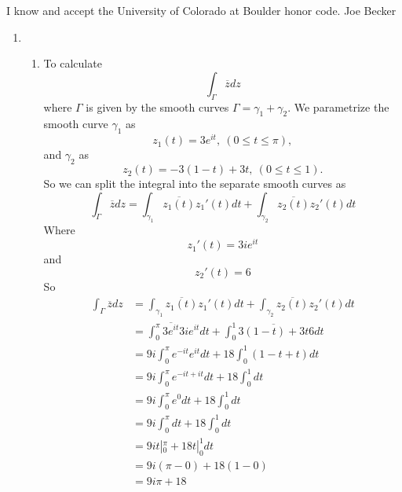 \documentclass[11pt]{article}
\newcommand{\zbar}{\overline{z}}
\begin{document}

I know and accept the University of Colorado at Boulder honor code.
\linebreak
\linebreak
\linebreak
Joe Becker

\begin{enumerate}
\item  
\begin{enumerate}
\item  
To calculate 
$$\int_{\Gamma}\zbar dz$$
where $\Gamma$ is given by the smooth curves $\Gamma = \gamma_1+\gamma_2$. We parametrize the smooth curve $\gamma_1$ as
$$z_1(t) = 3e^{it},\ (0\le t\le\pi),$$
and $\gamma_2$ as
$$z_2(t) = -3(1-t)+3t,\ (0\le t\le1).$$
So we can split the integral into the separate smooth curves as
$$\int_{\Gamma}\zbar dz = \int_{\gamma_1}\overline{z_1(t)}z_1'(t) dt + \int_{\gamma_2}\overline{z_2(t)}z_2'(t) dt$$
Where 
$$z_1'(t) = 3ie^{it}$$
and
$$z_2'(t) = 6$$
So
\begin{align*}
\int_{\Gamma}\zbar dz &= \int_{\gamma_1}\overline{z_1(t)}z_1'(t) dt + \int_{\gamma_2}\overline{z_2(t)}z_2'(t) dt\\
&= \int_0^{\pi}\overline{3e^{it}}3ie^{it}dt + \int_0^{1}\overline{3(1-t)+3t}6dt\\
&= 9i\int_0^{\pi}e^{-it}e^{it}dt + 18\int_0^1(1-t+t)dt\\
&= 9i\int_0^{\pi}e^{-it+it}dt + 18\int_0^1dt\\
&= 9i\int_0^{\pi}e^0dt + 18\int_0^1dt\\
&= 9i\int_0^{\pi}dt + 18\int_0^1dt\\
&= 9it|_0^{\pi} + 18t|_0^1dt\\
&= 9i(\pi-0) + 18(1-0)\\
&= 9i\pi + 18
\end{align*}


\end{enumerate}
\end{enumerate}
\end{document}
